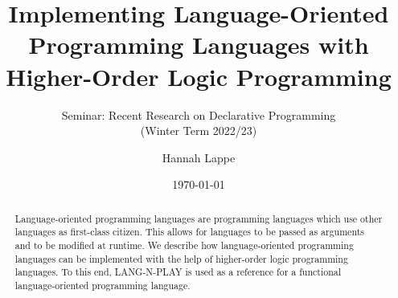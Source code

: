 \documentclass[a4paper, 12pt]{scrartcl}
\title{Implementing Language-Oriented Programming Languages with Higher-Order Logic Programming}
\subtitle{Seminar: Recent Research on Declarative Programming\\
  (Winter Term 2022/23)}
\author{Hannah Lappe}
\date{\today}
\begin{document}
\maketitle

\begin{abstract}
  Language-oriented programming languages are programming languages which use other languages as first-class citizen. This allows for languages to be passed as arguments and to be modified at runtime. We describe how language-oriented programming languages can be implemented with the help of higher-order logic programming languages. To this end, LANG-N-PLAY is used as a reference for a functional language-oriented programming language. 
\end{abstract}








\end{document}
